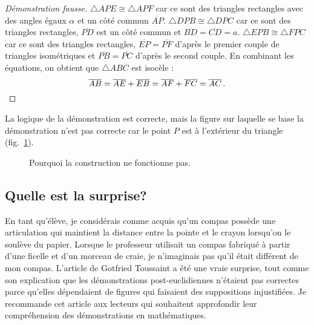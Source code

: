 \begin{proof}[Démonstration fausse]
$\triangle APE\cong \triangle APF$ car ce sont des triangles rectangles avec des angles égaux $\alpha$ et un côté commun $\overline{AP}$. $\triangle DPB\cong \triangle DPC$ car ce sont des triangles rectangles, $\overline{PD}$ est un côté commun et $\overline{BD}=\overline{CD}=a$. $\triangle EPB\cong \triangle FPC$ car ce sont des triangles rectangles, $\overline{EP}=\overline{PF}$ d'après le premier couple de triangles  isométriques et $\overline{PB}=\overline{PC}$ d'après le second couple. En combinant les équations, on obtient que $\triangle ABC$ est isocèle :
\[
\overline{AB}= \overline{AE}+\overline{EB}=\overline{AF}+\overline{FC} =\overline{AC}\,.
\qedhere\]
\end{proof}

La logique de la démonstration est correcte, mais la figure sur laquelle  se base la démonstration n'est pas correcte car le point $P$ est à l'extérieur du triangle (fig.~\ref{f.collapse-isoceles-2}).

\begin{figure}[htbp]
\centering
{}
     \caption{Pourquoi la construction ne fonctionne pas.}
      \label{f.collapse-isoceles-2}
\end{figure}




\subsection*{Quelle est la surprise?}

En tant qu'élève, je considérais comme acquis qu'un compas possède une articulation qui maintient la distance entre la pointe et le crayon lorsqu'on le soulève du papier. Lorsque le professeur utilisait un compas fabriqué à partir d'une ficelle et d'un morceau de craie, je n'imaginais pas qu'il était différent de mon compas. L'article de Gotfried Toussaint a été une vraie surprise, tout comme son explication que les démonstrations post-euclidiennes n'étaient pas  correctes parce qu'elles dépendaient de figures qui faisaient des suppositions injustifiées. Je recommande cet article aux lecteurs qui souhaitent approfondir leur compréhension des démonstrations en mathématiques.

